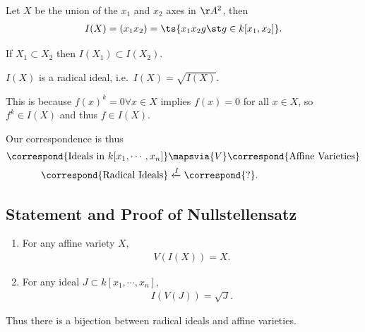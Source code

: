 \begin{example}

Let \(X\) be the union of the \(x_1\) and \(x_2\) axes in \(\AA^2\),
then
\begin{align*}
I(X) = (x_1 x_2) = \ts {x_1 x_2 g\st g\in k[x_1, x_2]}
.\end{align*}

\end{example}

\begin{fact}

If \(X_1 \subset X_2\) then \(I(X_1) \subset I(X_2)\).

\end{fact}

\begin{proposition}

\(I(X)\) is a radical ideal, i.e.~\(I(X) = \sqrt{I(X)}\).

This is because \(f(x)^k = 0 \forall x\in X\) implies \(f(x) = 0\) for
all \(x\in X\), so \(f^k \in I(X)\) and thus \(f\in I(X)\).

\end{proposition}

Our correspondence is thus
\begin{align*}  
\correspond{\text{Ideals in } k[x_1, \cdots, x_n]} &\mapsvia{V} \correspond{\text{Affine Varieties}} \\
\correspond{\text{Radical Ideals}} &\xleftarrow{I} \correspond{\text{?}}
.\end{align*}

\hypertarget{statement-and-proof-of-nullstellensatz}{%
\subsection{Statement and Proof of
Nullstellensatz}\label{statement-and-proof-of-nullstellensatz}}

\begin{theorem}

\envlist

\begin{enumerate}
\def\labelenumi{\alph{enumi}.}
\item
  For any affine variety \(X\),
  \begin{align*}
  V(I(X)) = X
  .\end{align*}
\item
  For any ideal \(J \subset k[x_1, \cdots, x_n]\),
  \begin{align*}
  I(V(J)) = \sqrt{J}
  .\end{align*}
\end{enumerate}

Thus there is a bijection between radical ideals and affine varieties.

\end{theorem}

